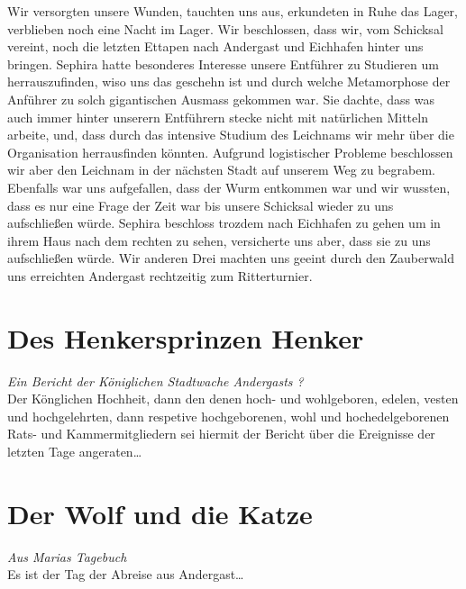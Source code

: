 \documentclass{book}
\begin{document}
    Wir versorgten unsere Wunden, tauchten uns aus, erkundeten in Ruhe das Lager, verblieben noch eine Nacht im Lager. Wir beschlossen, dass wir, vom Schicksal vereint, noch die letzten Ettapen nach Andergast und Eichhafen hinter uns bringen. Sephira hatte besonderes Interesse unsere Entführer zu Studieren um herrauszufinden, wiso uns das geschehn ist und durch welche Metamorphose der Anführer zu solch gigantischen Ausmass gekommen war. Sie dachte, dass was auch immer hinter unserern Entführern stecke nicht mit natürlichen Mitteln arbeite, und, dass durch das intensive Studium des Leichnams wir mehr über die Organisation herrausfinden könnten. Aufgrund logistischer Probleme beschlossen wir aber den Leichnam in der nächsten Stadt auf unserem Weg zu begrabem. Ebenfalls war uns aufgefallen, dass der Wurm entkommen war und wir wussten, dass es nur eine Frage der Zeit war bis unsere Schicksal wieder zu uns aufschließen würde. Sephira beschloss trozdem nach Eichhafen zu gehen um in ihrem Haus nach dem rechten zu sehen, versicherte uns aber, dass sie zu uns aufschließen würde. Wir anderen Drei machten uns geeint durch den Zauberwald uns erreichten Andergast rechtzeitig zum Ritterturnier.

    \chapter{Des Henkersprinzen Henker}
    \emph{Ein Bericht der Königlichen Stadtwache Andergasts ?}\\
    Der Könglichen Hochheit, dann den denen hoch- und wohlgeboren, edelen, vesten und hochgelehrten, dann respetive hochgeborenen, wohl und hochedelgeborenen Rats- und Kammermitgliedern sei hiermit der Bericht über die Ereignisse der letzten Tage angeraten\dots
    
    \chapter{Der Wolf und die Katze}
    \emph{Aus Marias Tagebuch}\\
    Es ist der Tag der Abreise aus Andergast\dots
\end{document}
